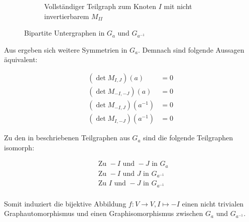 \begin{figure}[]
\begin{subfigure}[b]{0.47\textwidth}
        \caption{Vollständiger Teilgraph zum Knoten $I$ mit nicht invertierbarem $M_{II}$}
        \label{fig:complete-graph}
    \end{subfigure}
    \caption{Bipartite Untergraphen in $G_a$ und $G_{a^{-1}}$}
    \label{fig:subgraphs}
\end{figure}

Aus  ergeben sich weitere Symmetrien in $G_a$. Demnach sind folgende Aussagen äquivalent:

\begin{align*}
    (\det{} M_{I,J})(a) &= 0 \\
    (\det{} M_{-I,-J})(a) &= 0 \\
    (\det{} M_{-I,J})(a^{-1}) &= 0 \\
    (\det{} M_{I,-J})(a^{-1}) &= 0
\end{align*}

Zu den in  beschriebenen Teilgraphen aus $G_a$ sind die folgende Teilgraphen isomorph:

\begin{align*}
    &\text{Zu } -I \text{ und } -J \text{ in } G_a \\
    &\text{Zu } -I \text{ und } J \text{ in } G_{a^{-1}} \\
    &\text{Zu } I \text{ und } -J \text{ in } G_{a^{-1}} \\
\end{align*}

Somit induziert die bijektive Abbildung $f:V \to V, I \mapsto -I$ einen nicht trivialen Graphautomorphismus und einen Graphisomorphismus zwischen $G_a$ und $G_{a^{-1}}$.